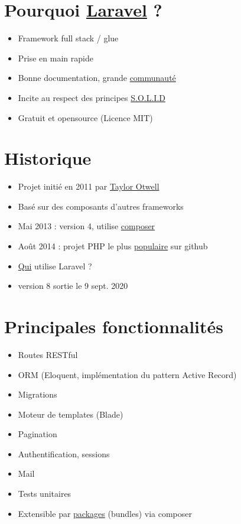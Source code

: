 \hypertarget{pourquoi-laravel}{%
\section{\texorpdfstring{Pourquoi \href{https://laravel.com/}{Laravel}
?}{Pourquoi Laravel ?}}\label{pourquoi-laravel}}

\begin{itemize}
\tightlist
\item
  Framework full stack / glue
\item
  Prise en main rapide
\item
  Bonne documentation, grande \href{http://laravel.io/forum}{communauté}
\item
  Incite au respect des principes
  \href{http://fr.wikipedia.org/wiki/SOLID_(informatique)}{S.O.L.I.D}
\item
  Gratuit et opensource (Licence MIT)
\end{itemize}

\hypertarget{historique}{%
\section{Historique}\label{historique}}

\begin{itemize}
\tightlist
\item
  Projet initié en 2011 par \href{http://taylorotwell.com/}{Taylor
  Otwell}
\item
  Basé sur des composants d'autres frameworks
\item
  Mai 2013 : version 4, utilise
  \href{https://getcomposer.org/}{composer}
\item
  Août 2014 : projet PHP le plus
  \href{https://github.com/search?l=PHP\&q=stars\%3A\%3E0\&ref=searchresults\&type=Repositories}{populaire}
  sur github
\item
  \href{https://madewithlaravel.com/}{Qui} utilise Laravel ?
\item
  version 8 sortie le 9 sept. 2020
\end{itemize}

\hypertarget{principales-fonctionnalituxe9s}{%
\section{Principales
fonctionnalités}\label{principales-fonctionnalituxe9s}}

\begin{itemize}
\tightlist
\item
  Routes RESTful
\item
  ORM (Eloquent, implémentation du pattern Active Record)
\item
  Migrations
\item
  Moteur de templates (Blade)
\item
  Pagination
\item
  Authentification, sessions
\item
  Mail
\item
  Tests unitaires
\item
  Extensible par \href{http://packalyst.com/}{packages} (bundles) via
  composer
\end{itemize}

